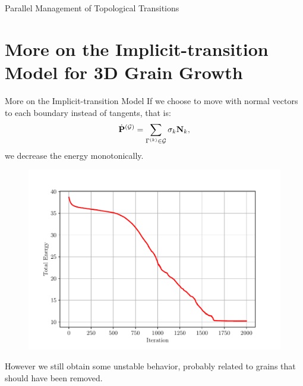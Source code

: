 \documentclass[usenames,dvipsnames]{beamer}
\begin{document}
\begin{frame}{Parallel Management of Topological Transitions}
    
\end{frame}

\section[3D Implicit-transition Model]{More on the Implicit-transition Model for 3D Grain Growth}

\begin{frame}{More on the Implicit-transition Model}
If we choose to move with normal vectors to each boundary instead of tangents, that is:
%
\begin{equation*}
    \dot{\mathbf{P}}^{(\mathcal{G})} = \sum_{\Gamma^{(k)} \in \mathcal{G}} \sigma_k \mathbf{N}_k,
\end{equation*}
%
we decrease the energy monotonically.
\begin{figure}
    \centering
    \includegraphics[trim={0 1em 0 3em},clip=true,scale=0.4]{figures/3d_voronoi/3D_energy2.pdf}
\end{figure}
\vspace{-1em}
However we still obtain some unstable behavior, probably related to grains that should have been removed.
\end{frame}
\end{document}

